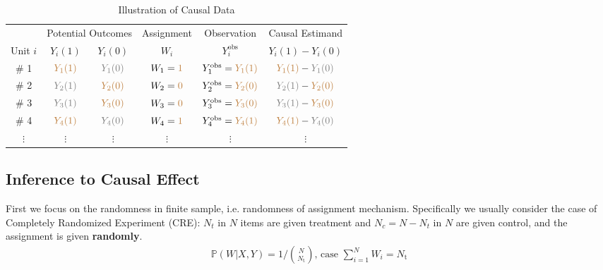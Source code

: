         \begin{table}[H]
            \centering
            \renewcommand\arraystretch{1}
            \caption{Illustration of Causal Data}
            \begin{tabular}{cccccc}
                \hline
                \hline
                &\multicolumn{2}{c}{Potential Outcomes}&Assignment&Observation&Causal Estimand\\
                \cline{2-3}
                Unit $ i $&$ Y_i(1) $&$ Y_i(0) $&$ W_i $&$ Y^\mathrm{obs}_i  $&$ Y_i(1)-Y_i(0) $\\
                \hline
                \# 1&$ \color{brown}Y_1(1) $&$ \color{gray}Y_1(0) $&$ W_1={\color{brown}1} $&$ Y^\mathrm{obs}_1=\color{brown}Y_1(1)  $&$ {\color{brown}Y_1(1)}-{\color{gray}Y_1(0)} $\\
                \# 2&$ \color{gray}Y_2(1) $&$ \color{brown}Y_2(0) $&$ W_2={\color{brown}0} $&$ Y^\mathrm{obs}_2=\color{brown}Y_2(0)  $&$ {\color{gray}Y_2(1)}-{\color{brown}Y_2(0)} $\\
                \# 3&$ \color{gray}Y_3(1) $&$ \color{brown}Y_3(0) $&$ W_3={\color{brown}0} $&$ Y^\mathrm{obs}_3=\color{brown}Y_3(0)  $&$ {\color{gray}Y_3(1)}-{\color{brown}Y_3(0)} $\\
                \# 4&$ \color{brown}Y_4(1) $&$ \color{gray}Y_4(0) $&$ W_4={\color{brown}1} $&$ Y^\mathrm{obs}_4=\color{brown}Y_4(1)  $&$ {\color{brown}Y_4(1)}-{\color{gray}Y_4(0)} $\\
                $ \vdots $&$ \vdots $&$ \vdots $&$ \vdots $&$ \vdots $&$ \vdots $\\
                \hline
                \hline
            \end{tabular}
            \label{}
        \end{table}
    

    


\subsection{Inference to Causal Effect}

First we focus on the randomness in finite sample, i.e. randomness of assignment mechanism. Specifically we usually consider the case of Completely Randomized Experiment (CRE): $ N_t $ in $ N $ items are given treatment and $ N_c=N-N_t $ in $ N $ are given control, and the assignment is given \textbf{randomly}. 
\begin{align*}
    \mathbb{P}\left( W|X,Y \right)=1\bigg/\binom{N}{N_\mathrm{t} },\,\text{case }\sum_{i=1}^NW_i=N_\mathrm{t}   
\end{align*}



